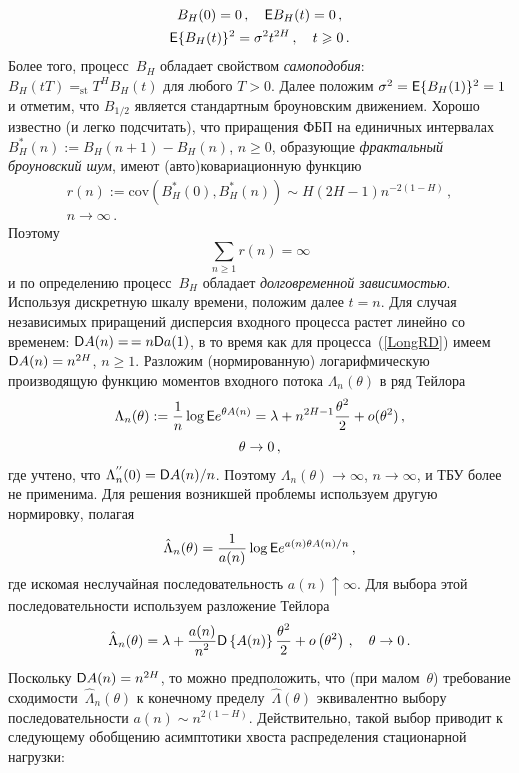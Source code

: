 \begin{multicols}{2}
\noindent
\begin{gather*}
 B_H(0)=0\,,\quad {\sf E} B_H(t)= 0\,,\\
 {\sf E} \{B_H(t)\} ^2= \sigma^2 t ^{2H}\,,\quad
 t\geqslant 0\,.
\end{gather*}
Более того, процесс~$B_H$ обладает свойством {\it самоподобия}:
$B_H(tT)=_{\mathrm{st}}T^H B_H(t)$ для любого $T>0$. Далее положим
$\sigma^2={\sf E} \{B_H(1)\}^2=1$ и отметим, что $B_{1/2}$ является
стандартным броуновским движением. Хорошо известно (и легко
подсчитать), что приращения ФБП на единичных интервалах
$B_H^*(n):=B_H(n+1)-B_H(n)$, $n\ge 0 $, образующие {\it фрактальный
броуновский шум}, имеют (авто)ковариационную функцию
\begin{multline*}
\!r(n):=\mathrm{cov}(B_H^*(0),B_H^*(n)) \sim H(2H-1) n^{-2(1-H)}\,, \\
 n\to \infty\,.
\end{multline*}
Поэтому
\begin{equation*}
\sum\limits_{n\ge 1}r(n)=\infty
\end{equation*}
и по определению процесс~$B_H$ обладает {\it долго\-временной зависимостью}.
Используя дискретную\linebreak
 шкалу времени, положим далее
$t=n$. Для случая независимых приращений дисперсия входного процесса
растет линейно со временем: ${\sf D} A(n) =$\linebreak $= n {\sf D} a(1)$, в то время как
для процесса~(\ref{LongRD}) имеем ${\sf D} A(n) = n^{2H}$, $n\ge 1$.
Разложим (нормированную) логарифмическую производящую функцию
моментов входного потока $\Lambda_n(\theta)$ в ряд Тейлора
\begin{multline*}
\Lambda_n(\theta):=\displaystyle\frac{\displaystyle 1\mathstrut}{\displaystyle n\mathstrut} \log {\sf E} e^{\theta A(n)}=\lambda+
n^{2H-1} \displaystyle\frac{\displaystyle \theta^2\mathstrut}{\displaystyle 2\mathstrut}+o(\theta^2)\,, \\
\theta\to 0\,,
\end{multline*}
где учтено, что $\Lambda_n^{''}(0)={\sf D} A(n)/n $. Поэтому
$\Lambda_n(\theta)\to \infty$, $n \to \infty$, и ТБУ более
не применима. Для решения возникшей проблемы используем другую
нормировку, полагая
\begin{equation*}
\hat \Lambda_n(\theta)= \displaystyle\frac{\displaystyle 1\mathstrut}{\displaystyle a(n)\mathstrut} \log {\sf E} e^{a(n)\theta A(n)/n}\,,
\end{equation*}
где искомая неслучайная последовательность\linebreak
$a(n) \uparrow \infty$.
Для выбора этой последовательности используем разложение Тейлора
\begin{equation*}
\hat \Lambda_n(\theta)=\lambda+ \displaystyle\frac{\displaystyle a(n)\mathstrut}{\displaystyle n^2\mathstrut} {\sf D}\left\{
A(n)\right\}\displaystyle\frac{\displaystyle \theta^2\mathstrut}{\displaystyle 2\mathstrut}+o\left(\theta^2\right)\,, \quad \theta\to 0\,.
\end{equation*}
Поскольку ${\sf D} A(n)=n^{2H}$, то можно предположить, что (при малом~$\theta$)
требование сходимости~$\hat \Lambda_n(\theta)$ к
конечному пределу~$\hat \Lambda(\theta)$ эквивалентно выбору
последовательности $a(n) \sim n^{2(1-H)}.$ Действительно, такой
выбор приводит к следующему обобщению асимптотики хвоста распределения стационарной нагрузки:


\end{multicols}
